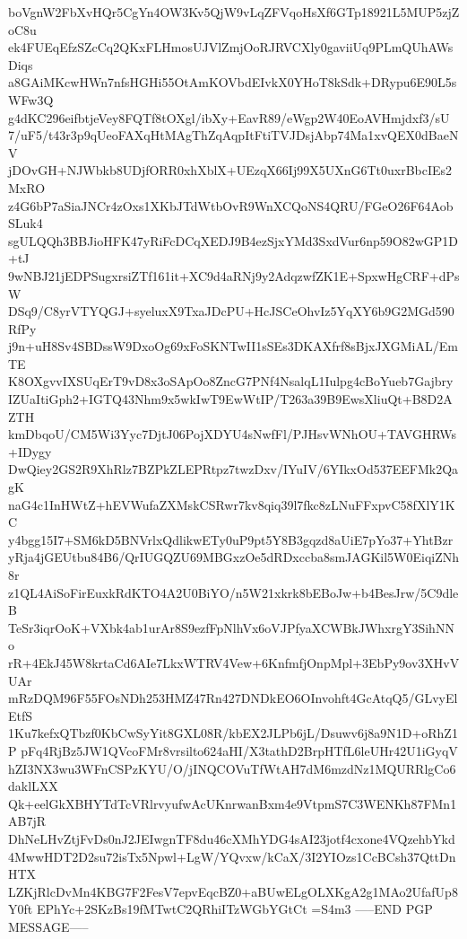 boVgnW2FbXvHQr5CgYn4OW3Kv5QjW9vLqZFVqoHsXf6GTp18921L5MUP5zjZoC8u
ek4FUEqEfzSZcCq2QKxFLHmosUJVlZmjOoRJRVCXly0gaviiUq9PLmQUhAWsDiqs
a8GAiMKcwHWn7nfsHGHi55OtAmKOVbdEIvkX0YHoT8kSdk+DRypu6E90L5sWFw3Q
g4dKC296eifbtjeVey8FQTf8tOXgl/ibXy+EavR89/eWgp2W40EoAVHmjdxf3/sU
7/uF5/t43r3p9qUeoFAXqHtMAgThZqAqpItFtiTVJDsjAbp74Ma1xvQEX0dBaeNV
jDOvGH+NJWbkb8UDjfORR0xhXblX+UEzqX66Ij99X5UXnG6Tt0uxrBbcIEs2MxRO
z4G6bP7aSiaJNCr4zOxs1XKbJTdWtbOvR9WnXCQoNS4QRU/FGeO26F64AobSLuk4
sgULQQh3BBJioHFK47yRiFcDCqXEDJ9B4ezSjxYMd3SxdVur6np59O82wGP1D+tJ
9wNBJ21jEDPSugxrsiZTf161it+XC9d4aRNj9y2AdqzwfZK1E+SpxwHgCRF+dPsW
DSq9/C8yrVTYQGJ+syeluxX9TxaJDcPU+HcJSCeOhvIz5YqXY6b9G2MGd590RfPy
j9n+uH8Sv4SBDssW9DxoOg69xFoSKNTwII1sSEs3DKAXfrf8sBjxJXGMiAL/EmTE
K8OXgvvIXSUqErT9vD8x3oSApOo8ZncG7PNf4NsalqL1Iulpg4cBoYueb7Gajbry
IZUaItiGph2+IGTQ43Nhm9x5wkIwT9EwWtIP/T263a39B9EwsXliuQt+B8D2AZTH
kmDbqoU/CM5Wi3Yyc7DjtJ06PojXDYU4sNwfFl/PJHsvWNhOU+TAVGHRWs+IDygy
DwQiey2GS2R9XhRlz7BZPkZLEPRtpz7twzDxv/IYuIV/6YIkxOd537EEFMk2QagK
naG4c1InHWtZ+hEVWufaZXMskCSRwr7kv8qiq39l7fkc8zLNuFFxpvC58fXlY1KC
y4bgg15I7+SM6kD5BNVrlxQdlikwETy0uP9pt5Y8B3gqzd8aUiE7pYo37+YhtBzr
yRja4jGEUtbu84B6/QrIUGQZU69MBGxzOe5dRDxccba8smJAGKil5W0EiqiZNh8r
z1QL4AiSoFirEuxkRdKTO4A2U0BiYO/n5W21xkrk8bEBoJw+b4BesJrw/5C9dleB
TeSr3iqrOoK+VXbk4ab1urAr8S9ezfFpNlhVx6oVJPfyaXCWBkJWhxrgY3SihNNo
rR+4EkJ45W8krtaCd6AIe7LkxWTRV4Vew+6KnfmfjOnpMpl+3EbPy9ov3XHvVUAr
mRzDQM96F55FOsNDh253HMZ47Rn427DNDkEO6OInvohft4GcAtqQ5/GLvyElEtfS
1Ku7kefxQTbzf0KbCwSyYit8GXL08R/kbEX2JLPb6jL/Dsuwv6j8a9N1D+oRhZ1P
pFq4RjBz5JW1QVcoFMr8vrsilto624aHI/X3tathD2BrpHTfL6leUHr42U1iGyqV
hZI3NX3wu3WFnCSPzKYU/O/jINQCOVuTfWtAH7dM6mzdNz1MQURRlgCo6daklLXX
Qk+eelGkXBHYTdTcVRlrvyufwAcUKnrwanBxm4e9VtpmS7C3WENKh87FMn1AB7jR
DhNeLHvZtjFvDs0nJ2JEIwgnTF8du46cXMhYDG4sAI23jotf4cxone4VQzehbYkd
4MwwHDT2D2su72isTx5Npwl+LgW/YQvxw/kCaX/3I2YIOzs1CcBCsh37QttDnHTX
LZKjRlcDvMn4KBG7F2FesV7epvEqcBZ0+aBUwELgOLXKgA2g1MAo2UfafUp8Y0ft
EPhYc+2SKzBs19fMTwtC2QRhiITzWGbYGtCt
=S4m3
-----END PGP MESSAGE-----
